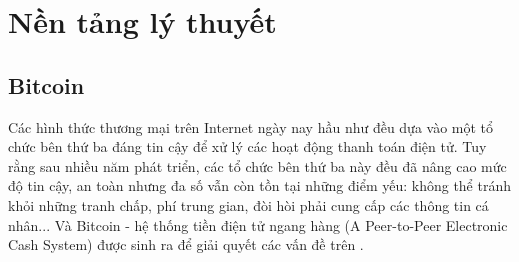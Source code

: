 \chapter{Nền tảng lý thuyết}
\section{Bitcoin}
Các hình thức thương mại trên Internet ngày nay hầu như đều dựa vào một tổ chức 
bên thứ ba đáng tin cậy để xử lý các hoạt động thanh toán điện tử. Tuy rằng sau 
nhiều năm phát triển, các tổ chức bên thứ ba này đều đã nâng cao mức độ tin cậy, 
an toàn nhưng đa số vẫn còn tồn tại những điểm yếu: không thể tránh khỏi những 
tranh chấp, phí trung gian, đòi hòi phải cung cấp các thông tin cá nhân... Và 
Bitcoin - hệ thống tiền điện tử ngang hàng (A Peer-to-Peer Electronic Cash System) 
được sinh ra để giải quyết các vấn đề trên \cite{BitcoinPaper}.
